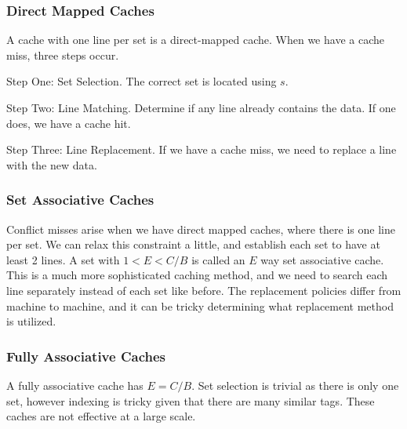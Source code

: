         \subsubsection{Direct Mapped Caches}
        A cache with one line per set is a direct-mapped cache. When we have a cache miss, three steps occur.

        Step One: Set Selection. The correct set is located using $s$.

        Step Two: Line Matching. Determine if any line already contains the data. If one does, we have a cache hit.

        Step Three: Line Replacement. If we have a cache miss, we need to replace a line with the new data.

        \subsubsection{Set Associative Caches}
        Conflict misses arise when we have direct mapped caches, where there is one line per set. We can relax this constraint a little, and establish each set to have at least 2 lines. A set with $1 < E < C/B$ is called an $E$ way set associative cache. This is a much more sophisticated caching method, and we need to search each line separately instead of each set like before. The replacement policies differ from machine to machine, and it can be tricky determining what replacement method is utilized.

        \subsubsection{Fully Associative Caches}
        A fully associative cache has $E = C/B$. Set selection is trivial as there is only one set, however indexing is tricky given that there are many similar tags. These caches are not effective at a large scale.

